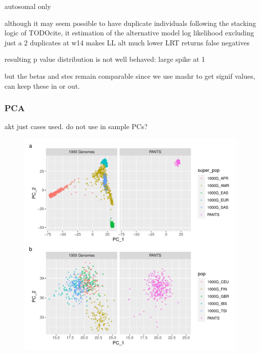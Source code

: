 \begin{outline}
autosomal only

although it may seem possible to have duplicate individuals
    following the stacking logic of TODOcite, 
    it estimation of the alternative model log likelihood
    excluding just a 2 duplicates at w14
    makes LL alt much lower
    LRT returns false negatives

    resulting p value distribution is not well behaved:
    large spike at 1

    but the betas and stes remain comparable
    since we use mashr to get signif values, 
    can keep these in or out. 


\subsubsection{PCA}

akt
    just cases used. do not use in sample PCs?

\begin{figure}
    \centering
    \includegraphics[width=1.0\textwidth,page=1]{mainmatter/figures/chapter_04/pants_samples.sampleids_cleaned_to_lowercase.filtered.GRCh38.sorted.multiPANTS.projection_1000G_pca.pdf}
    \caption{}
    \label{fig:multipants_genotype_akt_1000g_pca}
\end{figure}


\end{outline}

